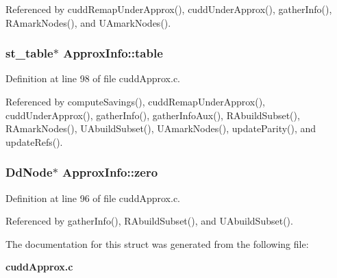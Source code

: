 Referenced by cudd\-Remap\-Under\-Approx(), cudd\-Under\-Approx(), gather\-Info(), RAmark\-Nodes(), and UAmark\-Nodes().
\subsubsection{\setlength{\rightskip}{0pt plus 5cm}\bf{st\_\-table}$\ast$ \bf{Approx\-Info::table}}\label{structApproxInfo_84e9719e444443e0d31f1f033155d9d5}




Definition at line 98 of file cudd\-Approx.c.

Referenced by compute\-Savings(), cudd\-Remap\-Under\-Approx(), cudd\-Under\-Approx(), gather\-Info(), gather\-Info\-Aux(), RAbuild\-Subset(), RAmark\-Nodes(), UAbuild\-Subset(), UAmark\-Nodes(), update\-Parity(), and update\-Refs().
\subsubsection{\setlength{\rightskip}{0pt plus 5cm}\bf{Dd\-Node}$\ast$ \bf{Approx\-Info::zero}}\label{structApproxInfo_42b86217a8d7d94f2ea6341ce585fa72}




Definition at line 96 of file cudd\-Approx.c.

Referenced by gather\-Info(), RAbuild\-Subset(), and UAbuild\-Subset().

The documentation for this struct was generated from the following file:\begin{CompactItemize}
\item 
\bf{cudd\-Approx.c}\end{CompactItemize}
